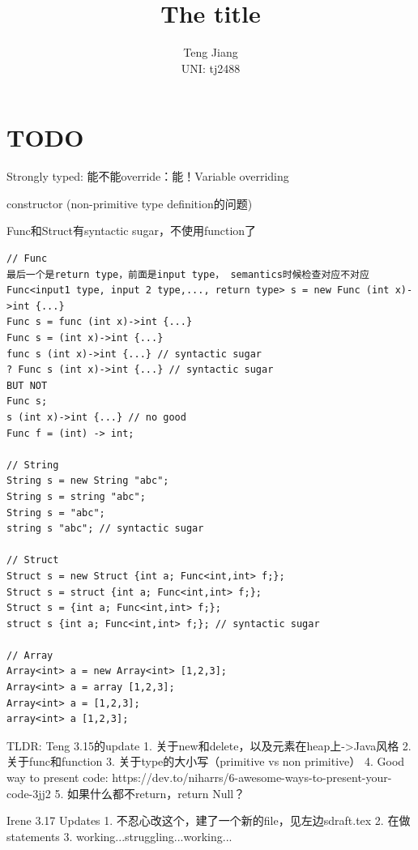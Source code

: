 \documentclass[11pt,A4]{article}
\begin{document}
\title{{\bigskip\bigskip\bigskip\bigskip\bigskip\bigskip\bigskip\bigskip\bigskip\bigskip\bigskip\Huge The title}\bigskip\bigskip}

\author{
 Teng Jiang \\ UNI: tj2488
}

\bigskip

\maketitle
\newpage
\tableofcontents
\newpage

\section{TODO}

Strongly typed: 
能不能override：能！Variable overriding

constructor (non-primitive type definition的问题)

Func和Struct有syntactic sugar，不使用function了
\begin{lstlisting}
// Func
最后一个是return type，前面是input type， semantics时候检查对应不对应
Func<input1 type, input 2 type,..., return type> s = new Func (int x)->int {...} 
Func s = func (int x)->int {...}
Func s = (int x)->int {...}
func s (int x)->int {...} // syntactic sugar
? Func s (int x)->int {...} // syntactic sugar
BUT NOT
Func s;
s (int x)->int {...} // no good
Func f = (int) -> int;

// String
String s = new String "abc";
String s = string "abc";
String s = "abc";
string s "abc"; // syntactic sugar

// Struct
Struct s = new Struct {int a; Func<int,int> f;};
Struct s = struct {int a; Func<int,int> f;};
Struct s = {int a; Func<int,int> f;};
struct s {int a; Func<int,int> f;}; // syntactic sugar

// Array
Array<int> a = new Array<int> [1,2,3];
Array<int> a = array [1,2,3];
Array<int> a = [1,2,3];
array<int> a [1,2,3];

\end{lstlisting}


TLDR: Teng 3.15的update
1. 关于new和delete，以及元素在heap上->Java风格
2. 关于func和function
3. 关于type的大小写（primitive vs non primitive）
4. Good way to present code: https://dev.to/niharrs/6-awesome-ways-to-present-your-code-3jj2
5. 如果什么都不return，return Null？

Irene 3.17 Updates
1. 不忍心改这个，建了一个新的file，见左边sdraft.tex
2. 在做statements
3. working...struggling...working...
\end{document}
